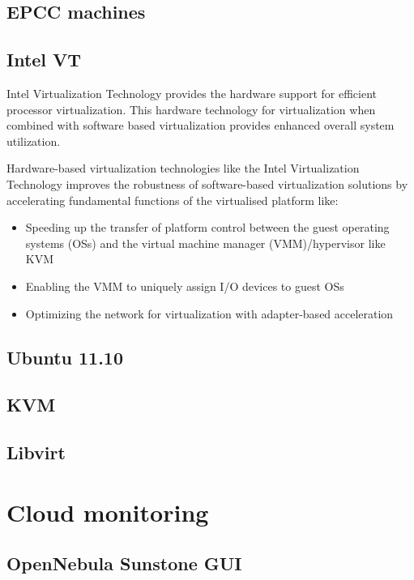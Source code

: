 \documentclass[12pt,a4paper]{report}
\begin{document}
\subsection{EPCC machines}
\subsection{Intel VT}

Intel Virtualization Technology provides the hardware support for efficient processor virtualization.
This hardware technology for virtualization when combined with software based virtualization provides 
enhanced overall system utilization.\cite{website:intel-VT}

Hardware-based virtualization technologies like the Intel Virtualization Technology
improves the robustness of software-based virtualization solutions by accelerating
fundamental functions of the virtualised platform like:\cite{neiger2006intel}

\begin{itemize}
 \item Speeding up the transfer of platform control between the guest operating systems (OSs) and the virtual machine manager (VMM)/hypervisor like KVM
 \item Enabling the VMM to uniquely assign I/O devices to guest OSs
 \item Optimizing the network for virtualization with adapter-based acceleration
\end{itemize}





\subsection{Ubuntu 11.10}
\subsection{KVM}
\subsection{Libvirt}

\section{Cloud monitoring}
\subsection{OpenNebula Sunstone GUI}
\end{document}
